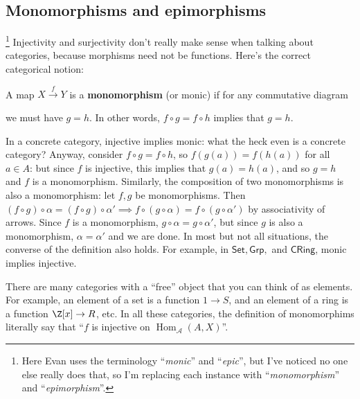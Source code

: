 \subsection{Monomorphisms and epimorphisms}

\footnote{Here Evan uses the terminology ``\emph{monic}'' and ``\emph{epic}'', but I've noticed no one else really does that, so I'm replacing each instance with ``\emph{monomorphism}'' and ``\emph{epimorphism}''.}
Injectivity and surjectivity don't really make sense when talking about categories, because morphisms need not be functions. Here's the correct categorical notion:
\begin{definition}[Monomorphisms]
    A map $X \overset{f}{\to } Y$ is a \textbf{monomorphism} (or monic) if for any commutative diagram
\begin{figure}[H]
\centering
{}
\end{figure}
we must have $g=h$. In other words, $f\circ g=f\circ h$ implies that $g=h$. \end{definition}
In a concrete category, injective implies monic: what the heck even is a concrete category? Anyway, consider $f\circ g=f\circ h$, so $f(g(a))=f(h(a))$ for all $a\in A$: but since $f$ is injective, this implies that $g(a)=h(a)$, and so $g=h$ and $f$ is a monomorphism. 
Similarly, the composition of two monomorphisms is also a monomorphism: let $f,g$ be monomorphisms. Then $(f\circ g)\circ \alpha = (f\circ g)\circ \alpha' \implies f \circ (g\circ \alpha )=f\circ (g\circ \alpha ') $ by associativity of arrows. Since $f$ is a monomorphism, $g\circ \alpha =g\circ \alpha '$, but since $g$ is also a monomorphism, $\alpha =\alpha '$ and we are done.
In most but not all situations, the converse of the definition also holds. For example, in $\mathsf{Set}, \mathsf{Grp} ,$ and $ \mathsf{CRing}  $, monic implies injective.

There are many categories with a ``free'' object that you can think of as elements. For example, an element of a set is a function $1 \to S$, and an element of a ring is a function $\Z[x]\to R$, etc. In all these categories, the definition of monomorphims literally say that ``$f$ is injective on $\operatorname{Hom}_{\mathcal{A} }(A,X)$''. 

